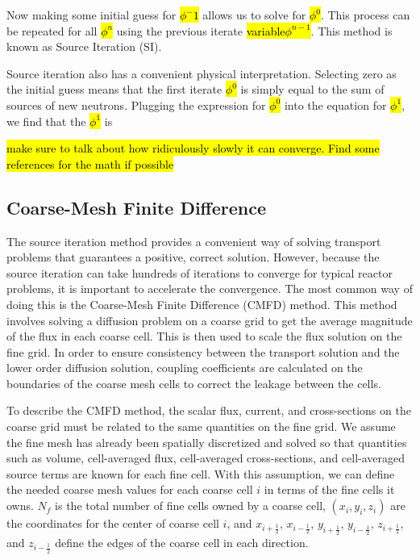 Now making some initial guess for \hl{$\phi^-1$} allows us to solve for \hl{$\phi^0$}.  This process can be repeated for all \hl{$\phi^n$} using the previous iterate \hl{variable$\phi^{n-1}$}.  This method is known as Source Iteration (SI).

Source iteration also has a convenient physical interpretation.  Selecting zero as the initial guess means that the first iterate \hl{$\phi^0$} is simply equal to the sum of sources of new neutrons.  Plugging the expression for \hl{$\phi^0$} into the equation for \hl{$\phi^1$}, we find that the \hl{$\phi^1$} is 

\hl{make sure to talk about how ridiculously slowly it can converge.  Find some references for the math if possible}

\subsection{Coarse-Mesh Finite Difference}\label{ss:CMFD}

The source iteration method provides a convenient way of solving transport problems that guarantees a positive, correct solution.  However, because the source iteration can take hundreds of iterations to converge for typical reactor problems, it is important to accelerate the convergence.  The most common way of doing this is the Coarse-Mesh Finite Difference (CMFD) method.  This method involves solving a diffusion problem on a coarse grid to get the average magnitude of the flux in each coarse cell.  This is then used to scale the flux solution on the fine grid.  In order to ensure consistency between the transport solution and the lower order diffusion solution, coupling coefficients are calculated on the boundaries of the coarse mesh cells to correct the leakage between the cells.

To describe the CMFD method, the scalar flux, current, and cross-sections on the coarse grid must be related to the same quantities on the fine grid.  We assume the fine mesh has already been spatially discretized and solved so that quantities such as volume, cell-averaged flux, cell-averaged cross-sections, and cell-averaged source terms are known for each fine cell.  With this assumption, we can define the needed coarse mesh values for each coarse cell $i$ in terms of the fine cells it owns.  $N_f$ is the total number of fine cells owned by a coarse cell, $\left(x_i,y_i,z_i\right)$ are the coordinates for the center of coarse cell $i$, and $x_{i+\frac{1}{2}}$, $x_{i-\frac{1}{2}}$, $y_{i+\frac{1}{2}}$, $y_{i-\frac{1}{2}}$, $z_{i+\frac{1}{2}}$, and $z_{i-\frac{1}{2}}$ define the edges of the coarse cell in each direction.

